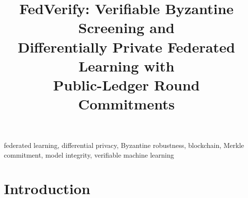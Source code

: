 \documentclass[conference]{IEEEtran}
\begin{document}
\title{FedVerify: Verifiable Byzantine Screening and\\
       Differentially Private Federated Learning with\\
       Public-Ledger Round Commitments}

\author{
\and
{}
}

\maketitle

\begin{abstract}
\end{abstract}

\begin{IEEEkeywords}
federated learning, differential privacy, Byzantine robustness, blockchain,
Merkle commitment, model integrity, verifiable machine learning
\end{IEEEkeywords}

\section{Introduction}
\end{document}
